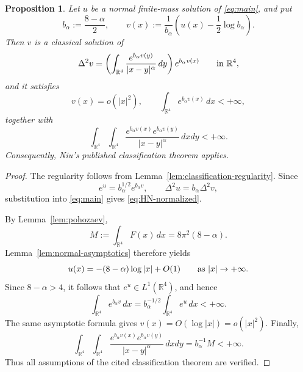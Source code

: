 \documentclass[11pt]{article}
\newtheorem{proposition}[theorem]{Proposition}
\numberwithin{equation}{section}
\begin{document}
\begin{proposition}\label{prop:reduction-HN}
Let \(u\) be a normal finite-mass solution of \eqref{eq:main}, and put
\[
b_{\alpha}:=\frac{8-\alpha}{2},
\qquad
v(x):=\frac{1}{b_{\alpha}}
\left(u(x)-\frac12\log b_{\alpha}\right).
\]
Then \(v\) is a classical solution of
\begin{equation}\label{eq:HN-normalized}
\Delta^{2}v=
\left(\int_{\mathbb R^{4}}
\frac{e^{b_{\alpha}v(y)}}{|x-y|^{\alpha}}\,dy\right)
e^{b_{\alpha}v(x)}
\qquad\hbox{in }\mathbb R^{4},
\end{equation}
and it satisfies
\begin{equation*}
v(x)=o(|x|^{2}),
\qquad
\int_{\mathbb R^{4}}e^{b_{\alpha}v(x)}\,dx<+\infty,
\end{equation*}
together with
\begin{equation*}
\int_{\mathbb R^{4}}\int_{\mathbb R^{4}}
\frac{e^{b_{\alpha}v(x)}e^{b_{\alpha}v(y)}}{|x-y|^{\alpha}}\,dxdy
<+\infty.
\end{equation*}
Consequently, Niu's published classification theorem \cite{NiuClassification} applies.
\end{proposition}

\begin{proof}
The regularity follows from Lemma~\ref{lem:classification-regularity}. Since
\[
e^{u}=b_{\alpha}^{1/2}e^{b_{\alpha}v},
\qquad
\Delta^{2}u=b_{\alpha}\Delta^{2}v,
\]
substitution into \eqref{eq:main} gives \eqref{eq:HN-normalized}.

By Lemma~\ref{lem:pohozaev},
\[
M:=\int_{\mathbb R^{4}}F(x)\,dx
=8\pi^{2}(8-\alpha).
\]
Lemma~\ref{lem:normal-asymptotics} therefore yields
\begin{equation*}
u(x)=-(8-\alpha)\log|x|+O(1)
\qquad\hbox{as }|x|\to+\infty.
\end{equation*}
Since \(8-\alpha>4\), it follows that \(e^{u}\in L^{1}(\mathbb R^{4})\), and hence
\[
\int_{\mathbb R^{4}}e^{b_{\alpha}v}\,dx
=b_{\alpha}^{-1/2}\int_{\mathbb R^{4}}e^{u}\,dx<+\infty.
\]
The same asymptotic formula gives \(v(x)=O(\log|x|)=o(|x|^{2})\). Finally,
\[
\int_{\mathbb R^{4}}\int_{\mathbb R^{4}}
\frac{e^{b_{\alpha}v(x)}e^{b_{\alpha}v(y)}}{|x-y|^{\alpha}}\,dxdy
=b_{\alpha}^{-1}M<+\infty.
\]
Thus all assumptions of the cited classification theorem are verified.
\end{proof}
\end{document}
